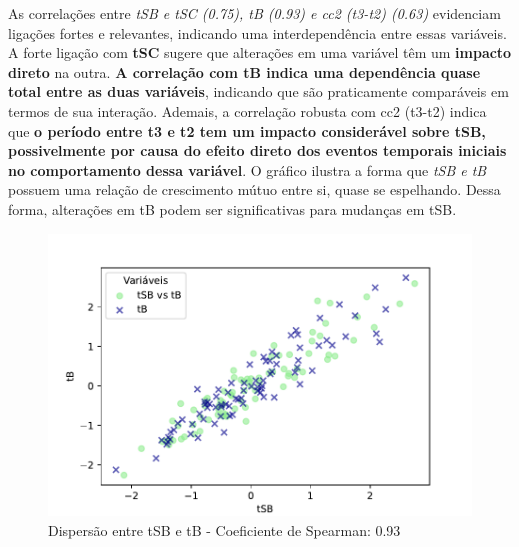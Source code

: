 As correlações entre \textit{tSB e tSC (0.75), tB (0.93) e cc2 (t3-t2) (0.63)} evidenciam ligações fortes e relevantes, indicando uma interdependência entre essas variáveis. A forte ligação com \textbf{tSC} sugere que alterações em uma variável têm um \textbf{impacto direto} na outra. \textbf{A correlação com tB indica uma dependência quase total entre as duas variáveis}, indicando que são praticamente comparáveis em termos de sua interação. Ademais, a correlação robusta com cc2 (t3-t2) indica que \textbf{o período entre t3 e t2 tem um impacto considerável sobre tSB, possivelmente por causa do efeito direto dos eventos temporais iniciais no comportamento dessa variável}. O gráfico ilustra a forma que \textit{tSB e tB} possuem uma relação de crescimento mútuo entre si, quase se espelhando. Dessa forma, alterações em tB podem ser significativas para mudanças em tSB.

\begin{figure}[h]
    \captionsetup{font=footnotesize, justification=centering, labelsep=period, position=above}
    \caption{Dispersão entre tSB e tB - Coeficiente de Spearman: 0.93}
    \label{fig:tSB-tB}
    \centering
    \includegraphics[scale=0.40]{figuras/Spearman/tSB-tB.pdf}
    \vspace{0.3cm} 
    \begin{minipage}{\linewidth}
        \centering
    \end{minipage}
\end{figure}
\FloatBarrier

